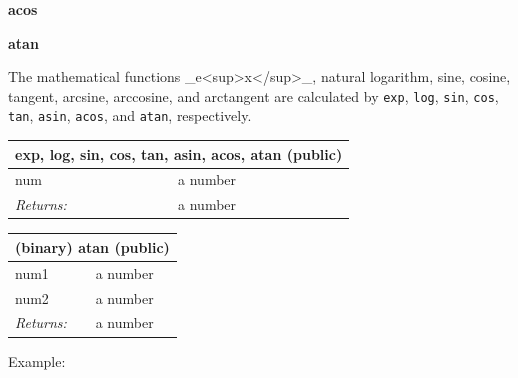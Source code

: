 \documentclass[twoside,9pt]{report}
\begin{document}
\textbf{acos}


\textbf{atan}


The mathematical functions \_e<sup>x</sup>\_, natural logarithm, sine, cosine, tangent, arcsine, arccosine, and arctangent are calculated by \texttt{exp}, \texttt{log}, \texttt{sin}, \texttt{cos}, \texttt{tan}, \texttt{asin}, \texttt{acos}, and \texttt{atan}, respectively.

\begin{tabular}{ |l l| }
\hline
\multicolumn{2}{|l|}{exp, log, sin, cos, tan, asin, acos, atan (public)} \\
\hline
num & a number \\
\textit{Returns:} & a number \\
\hline
\end{tabular}

\begin{tabular}{ |l l| }
\hline
\multicolumn{2}{|l|}{(binary) atan (public)} \\
\hline
num1 & a number \\
num2 & a number \\
\textit{Returns:} & a number \\
\hline
\end{tabular}


Example:
\end{document}
